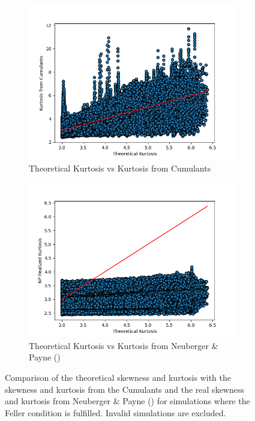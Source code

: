 \begin{figure}
\begin{subfigure}[b]{0.49\textwidth}
    \end{subfigure}
    \bigskip %
    \begin{subfigure}[b]{0.49\textwidth}
        \centering
        \includegraphics[width=\textwidth]{img/theoretical_kurtosis_vs_kurtosis_from_cumulants_feller_condition_true.png}
        \caption{Theoretical Kurtosis vs Kurtosis from Cumulants}
    \end{subfigure}
    \hfill
    \begin{subfigure}[b]{0.49\textwidth}
        \centering
        \includegraphics[width=\textwidth]{img/theoretical_kurtosis_vs_NP_rexcess_kurtosis_feller_condition_true.png}
        \caption{Theoretical Kurtosis vs Kurtosis from Neuberger \& Payne (\citeyear{neubergerSkewnessStockMarket2021})}
    \end{subfigure}
    \caption{Comparison of the theoretical skewness and kurtosis with the skewness and kurtosis from the Cumulants and the real skewness and kurtosis from Neuberger \& Payne (\citeyear{neubergerSkewnessStockMarket2021}) for simulations where the Feller condition is fulfilled. Invalid simulations are excluded.}
    \label{fig:theoretical_vs_real_skewness_kurtosis}
\end{figure}

